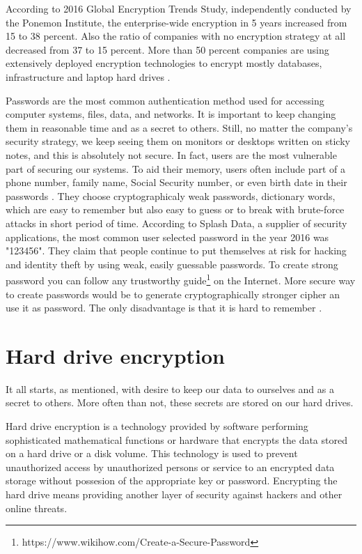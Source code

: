 According to 2016 Global Encryption Trends Study, independently conducted by the Ponemon Institute, the enterprise-wide encryption in 5 years increased from 15 to 38 percent.
Also the ratio of companies with no encryption strategy at all decreased from 37 to 15 percent.
More than 50 percent companies are using extensively deployed encryption technologies to encrypt mostly databases, infrastructure and laptop hard drives \cite{Thales}.

Passwords are the most common authentication method used for accessing computer systems, files, data, and networks.
It is important to keep changing them in reasonable time and as a secret to others.
Still, no matter the company's security strategy, we keep seeing them on monitors or desktops written on sticky notes, and this is absolutely not secure.
In fact, users are the most vulnerable part of securing our systems.
To aid their memory, users often include part of a phone number, family name, Social Security number, or even birth date in their passwords \cite{pwdsec}.
They choose cryptographicaly weak passwords, dictionary words, which are easy to remember but also easy to guess or to break with brute-force attacks in short period of time.
According to Splash Data, a supplier of security applications, the most common user selected password in the year 2016 was "123456".
They claim that people continue to put themselves at risk for hacking and identity theft by using weak, easily guessable passwords.
To create strong password you can follow any trustworthy guide\footnote{https://www.wikihow.com/Create-a-Secure-Password} on the Internet. %
More secure way to create passwords would be to generate cryptographically stronger cipher an use it as password.
The only disadvantage is that it is hard to remember \cite{splashdata}.

\section{Hard drive encryption}

It all starts, as mentioned, with desire to keep our data to ourselves and as a secret to others.
More often than not, these secrets are stored on our hard drives.

Hard drive encryption is a technology provided by software performing sophisticated mathematical functions or hardware that encrypts the data stored on a hard drive or a disk volume.
This technology is used to prevent unauthorized access by unauthorized persons or service to an encrypted data storage without possesion of the appropriate key or password.
Encrypting the hard drive means providing another layer of security against hackers and other online threats.

